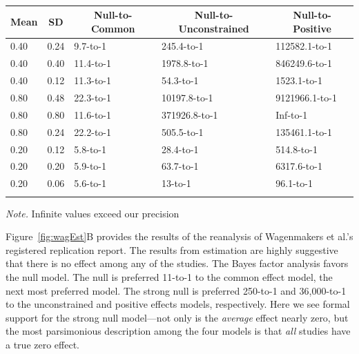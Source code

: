 \documentclass[english,man]{apa6}
\theoremstyle{definition}
\theoremstyle{definition}
\theoremstyle{definition}
\theoremstyle{remark}
\begin{document}
\begin{table}[tbp]
\begin{center}
\begin{threeparttable}
\caption{\label{tab:sens}}
\begin{tabular}{lllll}
\toprule
Mean & \multicolumn{1}{c}{SD} & \multicolumn{1}{c}{Null-to-Common} & \multicolumn{1}{c}{Null-to-Unconstrained} & \multicolumn{1}{c}{Null-to-Positive}\\
\midrule
0.40 & 0.24 & 9.7-to-1 & 245.4-to-1 & 112582.1-to-1\\
0.40 & 0.40 & 11.4-to-1 & 1978.8-to-1 & 846249.6-to-1\\
0.40 & 0.12 & 11.3-to-1 & 54.3-to-1 & 1523.1-to-1\\
0.80 & 0.48 & 22.3-to-1 & 10197.8-to-1 & 9121966.1-to-1\\
0.80 & 0.80 & 11.6-to-1 & 371926.8-to-1 & Inf-to-1\\
0.80 & 0.24 & 22.2-to-1 & 505.5-to-1 & 135461.1-to-1\\
0.20 & 0.12 & 5.8-to-1 & 28.4-to-1 & 514.8-to-1\\
0.20 & 0.20 & 5.9-to-1 & 63.7-to-1 & 6317.6-to-1\\
0.20 & 0.06 & 5.6-to-1 & 13-to-1 & 96.1-to-1\\
\bottomrule
\addlinespace
\end{tabular}
\begin{tablenotes}[para]
\textit{Note.} Infinite values exceed our precision
\end{tablenotes}
\end{threeparttable}
\end{center}
\end{table}

Figure~\ref{fig:wagEst}B provides the results of the reanalysis of
Wagenmakers et al.'s registered replication report. The results from
estimation are highly suggestive that there is no effect among any of
the studies. The Bayes factor analysis favors the null model. The null
is preferred 11-to-1 to the common effect model, the next most preferred
model. The strong null is preferred 250-to-1 and 36,000-to-1 to the
unconstrained and positive effects models, respectively. Here we see
formal support for the strong null model---not only is the
\emph{average} effect nearly zero, but the most parsimonious description
among the four models is that \emph{all} studies have a true zero
effect.
\end{document}
